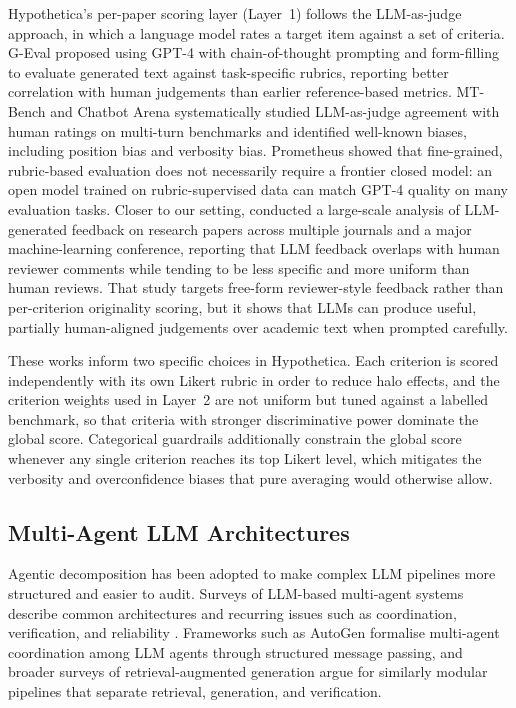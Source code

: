 Hypothetica's per-paper scoring layer (Layer~1) follows the LLM-as-judge approach, in which a language model rates a target item against a set of criteria. G-Eval \citep{liu2023geval} proposed using GPT-4 with chain-of-thought prompting and form-filling to evaluate generated text against task-specific rubrics, reporting better correlation with human judgements than earlier reference-based metrics. MT-Bench and Chatbot Arena \citep{zheng2023mtbench} systematically studied LLM-as-judge agreement with human ratings on multi-turn benchmarks and identified well-known biases, including position bias and verbosity bias. Prometheus \citep{kim2024prometheus} showed that fine-grained, rubric-based evaluation does not necessarily require a frontier closed model: an open model trained on rubric-supervised data can match GPT-4 quality on many evaluation tasks. Closer to our setting, \citet{liang2024llmfeedback} conducted a large-scale analysis of LLM-generated feedback on research papers across multiple journals and a major machine-learning conference, reporting that LLM feedback overlaps with human reviewer comments while tending to be less specific and more uniform than human reviews. That study targets free-form reviewer-style feedback rather than per-criterion originality scoring, but it shows that LLMs can produce useful, partially human-aligned judgements over academic text when prompted carefully.

These works inform two specific choices in Hypothetica. Each criterion is scored independently with its own Likert rubric in order to reduce halo effects, and the criterion weights used in Layer~2 are not uniform but tuned against a labelled benchmark, so that criteria with stronger discriminative power dominate the global score. Categorical guardrails additionally constrain the global score whenever any single criterion reaches its top Likert level, which mitigates the verbosity and overconfidence biases that pure averaging would otherwise allow.

\subsection{Multi-Agent LLM Architectures}

Agentic decomposition has been adopted to make complex LLM pipelines more structured and easier to audit. Surveys of LLM-based multi-agent systems describe common architectures and recurring issues such as coordination, verification, and reliability \citep{guo2024multiagent,zheng2025}. Frameworks such as AutoGen \citep{wu2023autogen} formalise multi-agent coordination among LLM agents through structured message passing, and broader surveys of retrieval-augmented generation \citep{gao2024ragsurvey} argue for similarly modular pipelines that separate retrieval, generation, and verification.

